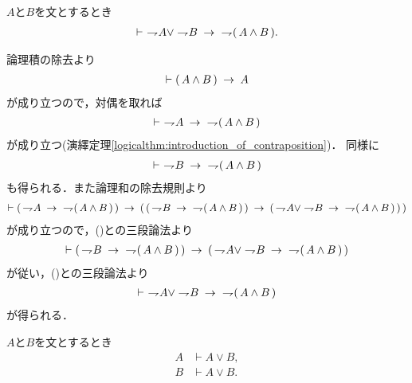 	\begin{screen}
		\begin{logicalthm}
		\label{logicalthm:strong_De_Morgan_law_1}
			$A$と$B$を文とするとき
			\begin{align}
				\vdash\ \negation A \vee \negation B
				\rarrow\ \negation (\, A \wedge B\, ).
			\end{align}
		\end{logicalthm}
	\end{screen}
	
	\begin{prf}
		論理積の除去より
		\begin{align}
			\vdash (\, A \wedge B\, ) \rarrow A
		\end{align}
		が成り立つので，対偶を取れば
		\begin{align}
			\vdash\ \negation A \rarrow\ \negation (\, A \wedge B\, )
			\label{fom:strong_De_Morgan_law_1_1}
		\end{align}
		が成り立つ(演繹定理\ref{logicalthm:introduction_of_contraposition})．
		同様に
		\begin{align}
			\vdash\ \negation B \rarrow\ \negation (\, A \wedge B\, )
			\label{fom:strong_De_Morgan_law_1_2}
		\end{align}
		も得られる．また論理和の除去規則より
		\begin{align}
			\vdash (\, \negation A \rarrow\ \negation (\, A \wedge B\, )\, )
			\rarrow (\, (\, \negation B \rarrow\ \negation (\, A \wedge B\, )\, )
			\rarrow (\, \negation A \vee \negation B 
			\rarrow\ \negation (\, A \wedge B\, )\, )\, )
		\end{align}
		が成り立つので，()との三段論法より
		\begin{align}
			\vdash (\, \negation B \rarrow\ \negation (\, A \wedge B\, )\, )
			\rarrow (\, \negation A \vee \negation B 
			\rarrow\ \negation (\, A \wedge B\, )\, )
		\end{align}
		が従い，()との三段論法より
		\begin{align}
			\vdash\ \negation A \vee \negation B 
			\rarrow\ \negation (\, A \wedge B\, )
		\end{align}
		が得られる．
		\QED
	\end{prf}
	
	\begin{screen}
		\begin{logicalaxm}[論理和の導入]
		\label{logicalaxm:introduction_of_disjunction}
			$A$と$B$を文とするとき
			\begin{align}
				A &\vdash A \vee B, \\
				B &\vdash A \vee B.
			\end{align}
		\end{logicalaxm}
	\end{screen}
	

